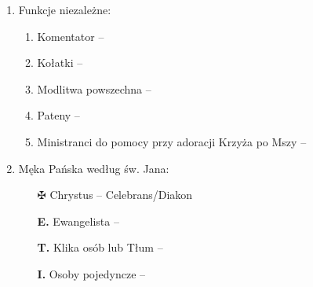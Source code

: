 \documentclass[10pt,oneside,final,notitlepage,a4paper,wide]{mwart}
\begin{document}
\begin{enumerate}
\smallskip
	\item Funkcje niezależne:
	\begin{enumerate}
		\item Komentator --
		\item Kołatki -- 
		\item Modlitwa powszechna -- 
		\item Pateny --
		\item Ministranci do pomocy przy adoracji Krzyża po Mszy --
	\end{enumerate}
\medskip
	\item Męka Pańska według św. Jana:
	\begin{itemize}
		\item[$\maltese$] Chrystus -- Celebrans/Diakon
		\item[\textbf{E.}] Ewangelista -- 
		\item[\textbf{T.}] Klika osób lub Tłum -- 
		\item[\textbf{I.}] Osoby pojedyncze -- 
	\end{itemize}
\end{enumerate}
\end{document}
